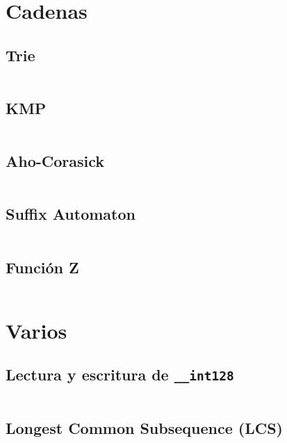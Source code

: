 \documentclass[11pt]{article}
\begin{document}
		
	\newpage
	\section{Cadenas}
		\subsection{Trie}
		\inputminted[tabsize=2,breaklines,firstline=144,lastline=196,fontsize=\small]{c++}{strings.cpp}
		
		\subsection{KMP}
		\inputminted[tabsize=2,breaklines,firstline=4,lastline=39,fontsize=\small]{c++}{strings.cpp}
		
		\subsection{Aho-Corasick}
		\inputminted[tabsize=2,breaklines,firstline=41,lastline=142,fontsize=\small]{c++}{strings.cpp}

		\subsection{Suffix Automaton}
		\inputminted[tabsize=2,breaklines,firstline=198,lastline=239,fontsize=\small]{c++}{strings.cpp}
		
		\subsection{Función Z}
		\inputminted[tabsize=2,breaklines,firstline=241,lastline=253,fontsize=\small]{c++}{strings.cpp}
	
	\newpage
	\section{Varios}
		\subsection{Lectura y escritura de \texttt{\_\_int128}}
		\inputminted[tabsize=2,breaklines,firstline=46,lastline=83,fontsize=\small]{c++}{misc.cpp}
		
		\subsection{Longest Common Subsequence (LCS)}
		\inputminted[tabsize=2,breaklines,firstline=21,lastline=33,fontsize=\small]{c++}{misc.cpp}
		
\end{document}
